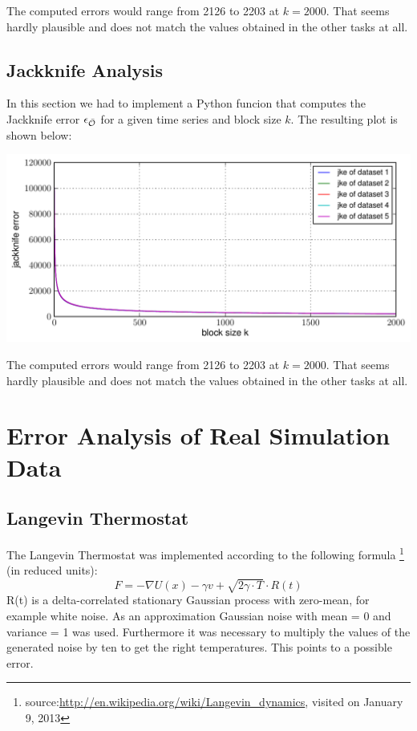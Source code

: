 \documentclass[12pt,a4paper]{scrartcl}
\begin{document}
The computed errors would range from 2126 to 2203 at $k=2000$. That seems hardly plausible and does not match the values obtained in the other tasks at all.

\subsection{Jackknife Analysis}
In this section we had to implement a Python funcion that computes the Jackknife error $\epsilon_{\bar{\cal O} {}}$ for a given time series and block size $k$. The resulting plot is shown below:

\begin{minipage}[hbt]{15cm}
	\centering
	\includegraphics[width=16cm]{../plots/jackk.pdf}
\end{minipage}

The computed errors would range from 2126 to 2203 at $k=2000$. That seems hardly plausible and does not match the values obtained in the other tasks at all.

\section{Error Analysis of Real Simulation Data}

\subsection{Langevin Thermostat}

The Langevin Thermostat was implemented according to the following formula \footnote{source:\url{http://en.wikipedia.org/wiki/Langevin_dynamics}, visited on January 9, 2013} (in reduced units):
\begin{equation}
	F = - \nabla U(x) - \gamma v + \sqrt{2\gamma\cdot T}\cdot R(t)
\end{equation}
R(t) is a delta-correlated stationary Gaussian process with zero-mean, for example white noise. As an approximation Gaussian noise with mean = 0 and variance = 1 was used. Furthermore it was necessary to multiply the values of the generated noise by ten to get the right temperatures. This points to a possible error.\\
\end{document}
